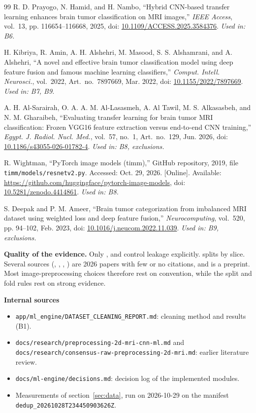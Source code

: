 \documentclass[11pt,a4paper]{article}
\begin{document}
\begin{thebibliography}{99}
 R. D. Prayogo, N. Hamid, and H. Nambo, ``Hybrid CNN-based transfer learning enhances brain tumor classification on MRI images,'' \emph{IEEE Access}, vol.~13, pp. 116654--116668, 2025, doi: \href{https://doi.org/10.1109/ACCESS.2025.3584376}{10.1109/ACCESS.2025.3584376}. \emph{Used in: B6.}

 H. Kibriya, R. Amin, A. H. Alshehri, M. Masood, S. S. Alshamrani, and A. Alshehri, ``A novel and effective brain tumor classification model using deep feature fusion and famous machine learning classifiers,'' \emph{Comput. Intell. Neurosci.}, vol.~2022, Art.~no.~7897669, Mar. 2022, doi: \href{https://doi.org/10.1155/2022/7897669}{10.1155/2022/7897669}. \emph{Used in: B7, B9.}

 A. H. Al-Sarairah, O. A. A. M. Al-Lasasmeh, A. Al Tawil, M. S. Alkasasbeh, and N. M. Gharaibeh, ``Evaluating transfer learning for brain tumor MRI classification: Frozen VGG16 feature extraction versus end-to-end CNN training,'' \emph{Egypt. J. Radiol. Nucl. Med.}, vol.~57, no.~1, Art.~no.~129, Jun. 2026, doi: \href{https://doi.org/10.1186/s43055-026-01782-4}{10.1186/s43055-026-01782-4}. \emph{Used in: B8, exclusions.}

 R. Wightman, ``PyTorch image models (timm),'' GitHub repository, 2019, file \texttt{timm/models/resnetv2.py}. Accessed: Oct. 29, 2026. [Online]. Available: \url{https://github.com/huggingface/pytorch-image-models}, doi: \href{https://doi.org/10.5281/zenodo.4414861}{10.5281/zenodo.4414861}. \emph{Used in: B8.}

 S. Deepak and P. M. Ameer, ``Brain tumor categorization from imbalanced MRI dataset using weighted loss and deep feature fusion,'' \emph{Neurocomputing}, vol.~520, pp. 94--102, Feb. 2023, doi: \href{https://doi.org/10.1016/j.neucom.2022.11.039}{10.1016/j.neucom.2022.11.039}. \emph{Used in: B9, exclusions.}

\end{thebibliography}

\textbf{Quality of the evidence.} Only \cite{r1}, \cite{r2} and \cite{r4} control leakage explicitly. \cite{r10} splits by slice. Several sources (\cite{r1}, \cite{r4}, \cite{r6}, \cite{r10}) are 2026 papers with few or no citations, and \cite{r1} is a preprint. Most image-preprocessing choices therefore rest on convention, while the split and fold rules rest on strong evidence.

\textbf{Internal sources}
\begin{itemize}
  \item \texttt{app/ml\_engine/DATASET\_CLEANING\_REPORT.md}: cleaning method and results (B1).
  \item \texttt{docs/research/preprocessing-2d-mri-cnn-ml.md} and \texttt{docs/research/consensus-raw-preprocessing-2d-mri.md}: earlier literature review.
  \item \texttt{docs/ml-engine/decisions.md}: decision log of the implemented modules.
  \item Measurements of section~\ref{sec:data}, run on 2026-10-29 on the manifest \texttt{dedup\_20261028T234450903626Z}.
\end{itemize}
\end{document}
